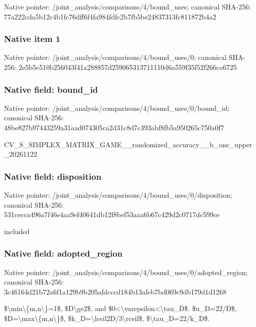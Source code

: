 \documentclass[10pt,a4paper]{article}
\begin{document}
Native pointer: /joint\_analysis/comparis\allowbreak{}ons/4/bound\_uses; canonical SHA-256: 77a222cda5b12c4b1fc76dff\allowbreak{}6f4fa984fdfc2b7fb5be2483\allowbreak{}7313fc811872b4a2



\subsubsection{Native item 1}


Native pointer: /joint\_analysis/comparis\allowbreak{}ons/4/bound\_uses/0; canonical SHA-256: 2e5b5e510b256043f41a2888\allowbreak{}57d259065313711110d6a559\allowbreak{}f35f52f266ca6725



\subsubsection{Native field: bound\_id}


Native pointer: /joint\_analysis/comparis\allowbreak{}ons/4/bound\_uses/0/bound\allowbreak{}\_id; canonical SHA-256: 48be827b97443259a31aad07\allowbreak{}4305ca2d31c8d7c393abf8fb\allowbreak{}5a950265c750a0f7


CV\_S\_SIMPLEX\_MATRIX\_GAME\allowbreak{}\_\_randomized\_accuracy\_\_b\allowbreak{}\_one\_upper\_20261122


\subsubsection{Native field: disposition}


Native pointer: /joint\_analysis/comparis\allowbreak{}ons/4/bound\_uses/0/dispo\allowbreak{}sition; canonical SHA-256: 531cecca496a7f46e4aa9ef4\allowbreak{}0641db12f8bef53aaa6b67c4\allowbreak{}29d2c0717dc599ce


included


\subsubsection{Native field: adopted\_region}


Native pointer: /joint\_analysis/comparis\allowbreak{}ons/4/bound\_uses/0/adopt\allowbreak{}ed\_region; canonical SHA-256: 3c46164d21b72a6f1a129b9b\allowbreak{}205afdcccd184b13afeb7bd0\allowbreak{}69c9db179d1d1268


\$\textbackslash{}min\textbackslash{}\{m,n\textbackslash{}\}=1\$, \$D\textbackslash{}ge2\$, and \$0<\textbackslash{}varepsilon<\textbackslash{}tau\_D\$. \$u\_D=22/D\$, \$D=\textbackslash{}max\textbackslash{}\{m,n\textbackslash{}\}\$, \$k\_D=\textbackslash{}lceil2D/3\textbackslash{}rceil\$, \$\textbackslash{}tau\_D=22/k\_D\$.
\end{document}

